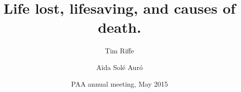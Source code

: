\documentclass{beamer}
\title[Year Lost]{Life lost, lifesaving, and causes of death.}
\author[Riffe \and Sol\'{e}]
{
Tim Riffe \inst{1} \and A{\"i}da Sol\'{e} Aur\'{o} \inst{2}}
\institute[VFU] %
{
  \inst{1}%
  Department of Demography\\
  University of California, Berkeley
  \and
  \inst{2}%
  Universitat Pompeu Fabra
}
\date %
{PAA annual meeting, May 2015}
\begin{document}
\begin{frame}
\titlepage %
\end{frame}
\end{document}

